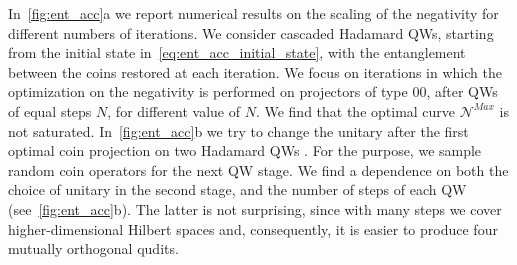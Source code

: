 \documentclass[
	aps, pra,
	superscriptaddress, twocolumn,
	floatfix,
	10pt
]{revtex4-1}
\newcommand{\parTitle}[1]{\noindent{\color{Mahogany}(\emph{#1})}}
\begin{document}
\parTitle{Numerical results}
In~\cref{fig:ent_acc}a we report numerical results on the scaling of the negativity for different numbers of iterations.
We consider cascaded Hadamard QWs, starting from the initial state in~\cref{eq:ent_acc_initial_state}, with the entanglement between the coins restored at each iteration.
We focus on iterations in which the optimization on the negativity is performed on projectors of type $00$, after QWs of equal steps $N$, for different value of $N$.
We find that the optimal curve $\mathcal{N}^{Max}$ is not saturated.
In~\cref{fig:ent_acc}b we try to change the unitary after the first optimal coin projection on two Hadamard QWs .
For the purpose, we sample random coin operators for the next QW stage. We find a dependence on both the choice of unitary in the second stage, and the number of steps of each QW (see~\cref{fig:ent_acc}b). The latter is not surprising, since with many steps we cover higher-dimensional Hilbert spaces and, consequently, it is easier to produce four mutually orthogonal qudits.
\end{document}
